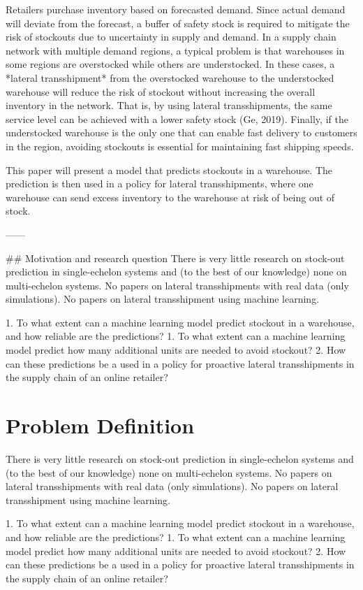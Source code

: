 \documentclass[../../main.tex]{subfiles}
\begin{document}
Retailers purchase inventory based on forecasted demand. Since actual demand will deviate from the forecast, a buffer of safety stock is required to mitigate the risk of stockouts due to uncertainty in supply and demand. In a supply chain network with multiple demand regions, a typical problem is that warehouses in some regions are overstocked while others are understocked. In these cases, a *lateral transshipment* from the overstocked warehouse to the understocked warehouse will reduce the risk of stockout without increasing the overall inventory in the network. That is, by using lateral transshipments, the same service level can be achieved with a lower safety stock  (Ge, 2019). Finally, if the understocked warehouse is the only one that can enable fast delivery to customers in the region, avoiding stockouts is essential for maintaining fast shipping speeds.

This paper will present a model that predicts stockouts in a warehouse. The prediction is then used in a policy for lateral transshipments, where one warehouse can send excess inventory to the warehouse at risk of being out of stock.

------

## Motivation and research question
There is very little research on stock-out prediction in single-echelon systems and (to the best of our knowledge) none on multi-echelon systems. No papers on lateral transshipments with real data (only simulations). No papers on lateral transshipment using machine learning.

1. To what extent can a machine learning model predict stockout in a warehouse, and how reliable are the predictions?
1. To what extent can a machine learning model predict how many additional units are needed to avoid stockout?
2. How can these predictions be a used in a policy for proactive lateral transshipments in the supply chain of an online retailer?

\section{Problem Definition}

There is very little research on stock-out prediction in single-echelon systems and (to the best of our knowledge) none on multi-echelon systems. No papers on lateral transshipments with real data (only simulations). No papers on lateral transshipment using machine learning.

1. To what extent can a machine learning model predict stockout in a warehouse, and how reliable are the predictions?
1. To what extent can a machine learning model predict how many additional units are needed to avoid stockout?
2. How can these predictions be a used in a policy for proactive lateral transshipments in the supply chain of an online retailer?

\end{document}

